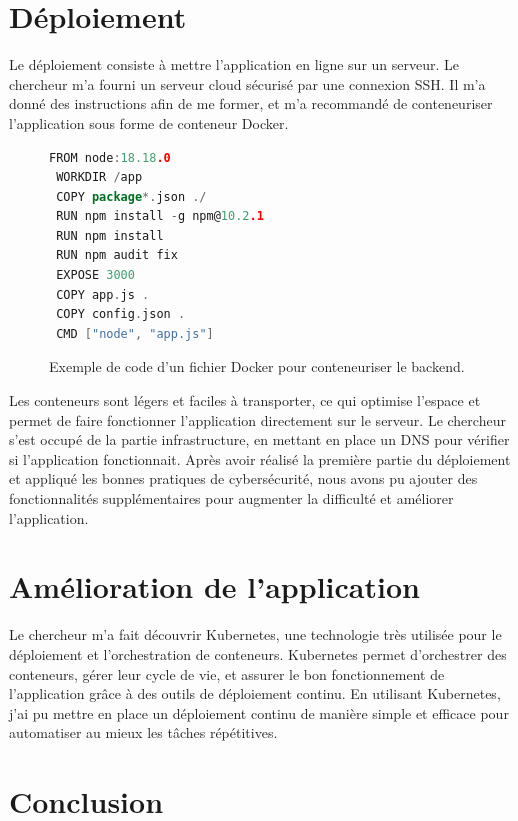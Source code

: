 \section{Déploiement}

Le déploiement consiste à mettre l’application en ligne sur un serveur.
Le chercheur m’a fourni un serveur cloud sécurisé par une connexion SSH. Il m’a donné des instructions afin de me former, et m'a recommandé de conteneuriser l’application sous forme de conteneur Docker.

\begin{figure}[H]
    \centering
    \begin{minipage}{.8\textwidth}
        \centering
        \begin{lstlisting}[language=Go]
 FROM node:18.18.0
 WORKDIR /app
 COPY package*.json ./
 RUN npm install -g npm@10.2.1
 RUN npm install
 RUN npm audit fix
 EXPOSE 3000
 COPY app.js .
 COPY config.json .
 CMD ["node", "app.js"]
        \end{lstlisting}
        \caption{Exemple de code d'un fichier Docker pour conteneuriser le backend.}
    \end{minipage}
\end{figure}

Les conteneurs sont légers et faciles à transporter, ce qui optimise l’espace et permet de faire fonctionner l’application directement sur le serveur. Le chercheur s’est occupé de la partie infrastructure, en mettant en place un DNS pour vérifier si l’application fonctionnait. Après avoir réalisé la première partie du déploiement et appliqué les bonnes pratiques de cybersécurité, nous avons pu ajouter des fonctionnalités supplémentaires pour augmenter la difficulté et améliorer l’application.

\section{Amélioration de l’application}

Le chercheur m'a fait découvrir Kubernetes, une technologie très utilisée pour le déploiement et l'orchestration de conteneurs. Kubernetes permet d'orchestrer des conteneurs, gérer leur cycle de vie, et assurer le bon fonctionnement de l'application grâce à des outils de déploiement continu. En utilisant Kubernetes, j'ai pu mettre en place un déploiement continu de manière simple et efficace pour automatiser au mieux les tâches répétitives.

\section{Conclusion}

